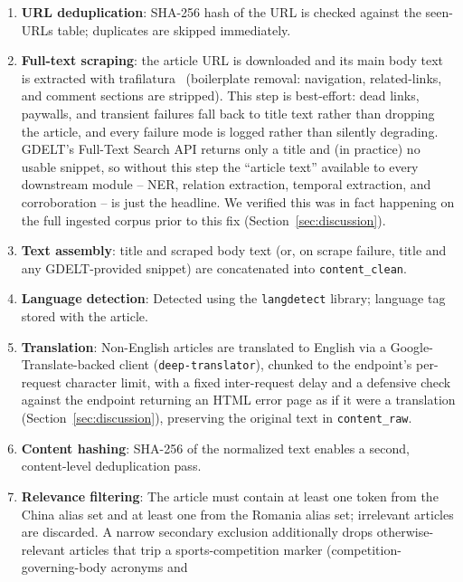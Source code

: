 \documentclass[conference]{IEEEtran}
\begin{document}
\begin{enumerate}
  \item \textbf{URL deduplication}: SHA-256 hash of the URL is checked
        against the seen-URLs table; duplicates are skipped immediately.
  \item \textbf{Full-text scraping}: the article URL is downloaded and its
        main body text is extracted with trafilatura~\cite{barbaresi2021trafilatura}
        (boilerplate removal: navigation, related-links, and comment
        sections are stripped). This step is best-effort: dead links,
        paywalls, and transient failures fall back to title text rather
        than dropping the article, and every failure mode is logged
        rather than silently degrading. GDELT's Full-Text Search API
        returns only a title and (in practice) no usable snippet, so
        without this step the ``article text'' available to every
        downstream module -- NER, relation extraction, temporal
        extraction, and corroboration -- is just the headline. We verified
        this was in fact happening on the full ingested corpus prior to
        this fix (Section~\ref{sec:discussion}).
  \item \textbf{Text assembly}: title and scraped body text (or, on scrape
        failure, title and any GDELT-provided snippet) are concatenated
        into \texttt{content\_clean}.
  \item \textbf{Language detection}: Detected using the \texttt{langdetect}
        library; language tag stored with the article.
  \item \textbf{Translation}: Non-English articles are translated to
        English via a Google-Translate-backed client
        (\texttt{deep-translator}), chunked to the endpoint's per-request
        character limit, with a fixed inter-request delay and a defensive
        check against the endpoint returning an HTML error page as if it
        were a translation (Section~\ref{sec:discussion}), preserving the
        original text in \texttt{content\_raw}.
  \item \textbf{Content hashing}: SHA-256 of the normalized text enables
        a second, content-level deduplication pass.
  \item \textbf{Relevance filtering}: The article must contain at least
        one token from the China alias set and at least one from the Romania
        alias set; irrelevant articles are discarded. A narrow secondary
        exclusion additionally drops otherwise-relevant articles that trip a
        sports-competition marker (competition-governing-body acronyms and

\end{enumerate}
\end{document}
